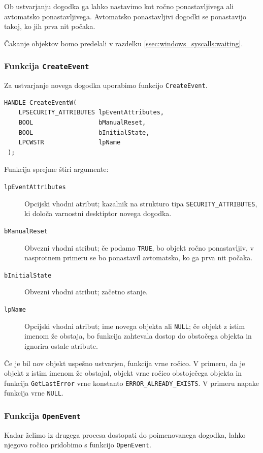 \documentclass[a4paper,12pt,openright]{book}
\begin{document}
Ob ustvarjanju dogodka ga lahko nastavimo kot ročno ponastavljivega ali avtomatsko ponastavljivega.
Avtomatsko ponastavljivi dogodki se ponastavijo takoj, ko jih prva nit počaka.

Čakanje objektov bomo predelali v razdelku \ref{ssec:windows_syscalls:waiting}.

\subsubsection{Funkcija \texttt{CreateEvent}}

Za ustvarjanje novega dogodka uporabimo funkcijo \texttt{CreateEvent}.

\begin{lstlisting}[style=func]
 HANDLE CreateEventW(
	LPSECURITY_ATTRIBUTES lpEventAttributes,
	BOOL                  bManualReset,
	BOOL                  bInitialState,
	LPCWSTR               lpName
 );
\end{lstlisting}

Funkcija sprejme štiri argumente:
\begin{description}
	\item[\texttt{lpEventAttributes}] Opcijski vhodni atribut; kazalnik na strukturo tipa \texttt{SECURITY\-\_ATTRIBUTES}, ki določa varnostni desktiptor novega dogodka.
	\item[\texttt{bManualReset}] Obvezni vhodni atribut; če podamo \texttt{TRUE}, bo objekt ročno ponastavljiv, v nasprotnem primeru se bo ponastavil avtomatsko, ko ga prva nit počaka.
	\item[\texttt{bInitialState}] Obvezni vhodni atribut; začetno stanje.
	\item[\texttt{lpName}] Opcijski vhodni atribut; ime novega objekta ali \texttt{NULL}; če objekt z istim imenom že obstaja, bo funkcija zahtevala dostop do obstočega objekta in ignorira ostale atribute.
\end{description}

Če je bil nov objekt uspešno ustvarjen, funkcija vrne ročico.
V primeru, da je objekt z istim imenom že obstajal, objekt vrne ročico obstoječega objekta in funkcija \texttt{GetLastError} vrne konstanto \texttt{ERROR\_ALREADY\_EXISTS}.
V primeru napake funkcija vrne \texttt{NULL}.

\subsubsection{Funkcija \texttt{OpenEvent}}

Kadar želimo iz drugega procesa dostopati do poimenovanega dogodka, lahko njegovo ročico pridobimo s funkcijo \texttt{OpenEvent}.
\end{document}
